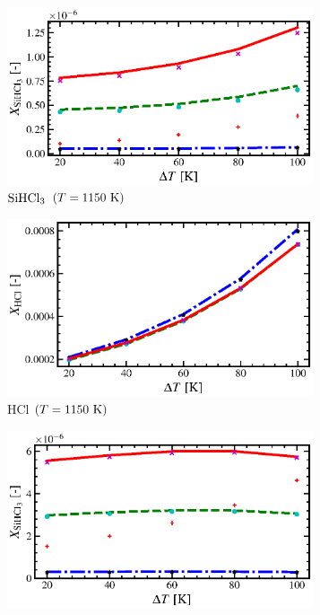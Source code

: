 \documentclass[final, letterpaper, square, comma, numbers, sort&compress]{elsarticle}
\begin{document}
\begin{figure}
    \centering
    \begin{subfigure}{0.49\textwidth}
        \centering
        \includegraphics[width=0.99\textwidth]{dT-vs-SiHCl3-T-1150-compare}
        \caption{$\rm SiHCl_3$ $(T=1150\rm\ K)$}
    \end{subfigure}
    \begin{subfigure}{0.49\textwidth}
        \centering
        \includegraphics[width=0.99\textwidth]{dT-vs-HCl-T-1150-compare}
        \caption{HCl $(T=1150\rm\ K)$}
    \end{subfigure}
    \begin{subfigure}{0.49\textwidth}
        \centering
        \includegraphics[width=0.99\textwidth]{dT-vs-SiHCl3-T-1250-compare}

\end{subfigure}
\end{figure}
\end{document}
